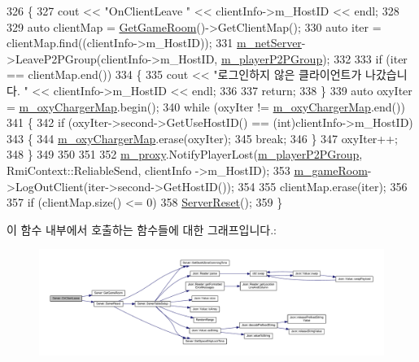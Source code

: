 \begin{DoxyCode}
326 \{
327     cout << \textcolor{stringliteral}{"OnClientLeave "} << clientInfo->m\_HostID << endl;
328 
329     \textcolor{keyword}{auto} clientMap = \hyperlink{class_server_ab5d6fa91446df16909dfbea64abddf76}{GetGameRoom}()->GetClientMap();
330     \textcolor{keyword}{auto} iter = clientMap.find((clientInfo->m\_HostID));
331     \hyperlink{class_server_acc5f0ab874532daace973f25df16888e}{m\_netServer}->LeaveP2PGroup(clientInfo->m\_HostID, \hyperlink{class_server_a8f7f03253584e9db740a5f9f97ff1fc5}{m\_playerP2PGroup});
332 
333     \textcolor{keywordflow}{if} (iter == clientMap.end())
334     \{
335         cout << \textcolor{stringliteral}{"로그인하지 않은 클라이언트가 나갔습니다. "} << clientInfo->m\_HostID << endl;
336 
337         \textcolor{keywordflow}{return};
338     \}
339     \textcolor{keyword}{auto} oxyIter = \hyperlink{class_server_ae2e40fd2b3d85dd1c92ab7bc6e6b7d65}{m\_oxyChargerMap}.begin();
340     \textcolor{keywordflow}{while} (oxyIter != \hyperlink{class_server_ae2e40fd2b3d85dd1c92ab7bc6e6b7d65}{m\_oxyChargerMap}.end())
341     \{
342         \textcolor{keywordflow}{if} (oxyIter->second->GetUseHostID() == (int)clientInfo->m\_HostID)
343         \{
344             \hyperlink{class_server_ae2e40fd2b3d85dd1c92ab7bc6e6b7d65}{m\_oxyChargerMap}.erase(oxyIter);
345             \textcolor{keywordflow}{break};
346         \}
347         oxyIter++;
348     \}
349 
350 
351 
352     \hyperlink{class_server_adbe7ca5dd78f70ef2771eb1724b397de}{m\_proxy}.NotifyPlayerLost(\hyperlink{class_server_a8f7f03253584e9db740a5f9f97ff1fc5}{m\_playerP2PGroup}, RmiContext::ReliableSend, clientInfo
      ->m\_HostID);
353     \hyperlink{class_server_a77f414d5bb41dd5de8626d8cd621113c}{m\_gameRoom}->LogOutClient(iter->second->GetHostID());
354 
355     clientMap.erase(iter);
356 
357     \textcolor{keywordflow}{if} (clientMap.size() <= 0)
358         \hyperlink{class_server_a88d53d3c77d90f211f3ca7cc51735171}{ServerReset}();
359 \}
\end{DoxyCode}
이 함수 내부에서 호출하는 함수들에 대한 그래프입니다.\+:
\nopagebreak
\begin{figure}[H]
\begin{center}
\leavevmode
\includegraphics[width=350pt]{class_server_a1249766dc00efcf1f29a2aaad56f83ef_cgraph}
\end{center}
\end{figure}
